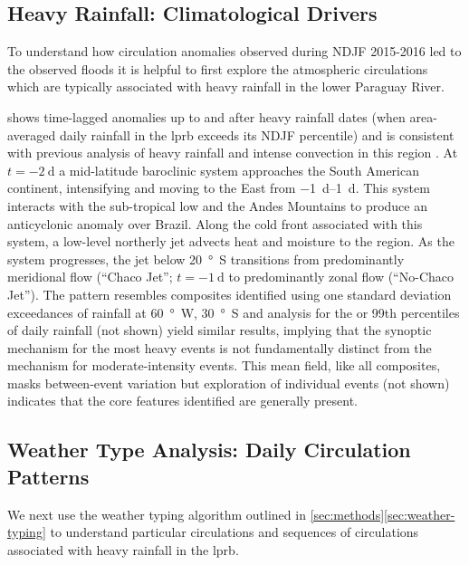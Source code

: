 \documentclass[twocol]{ametsoc}
\begin{document}
\subsection{Heavy Rainfall: Climatological Drivers} \label{sec:rainfall-circulation}

To understand how circulation anomalies observed during NDJF 2015-2016 led to the observed floods it is helpful to first explore the atmospheric circulations which are typically associated with heavy rainfall in the lower Paraguay River.

 shows time-lagged anomalies up to and after heavy rainfall dates (when area-averaged daily rainfall in the \gls{lprb} exceeds its NDJF  percentile) and is consistent with previous analysis of heavy rainfall and intense convection in this region \citep{Liebmann2004,Marengo2004,Salio2007,Marwan2015}.
At $t=\SI{-2}{\day}$ a mid-latitude baroclinic system approaches the South American continent, intensifying and moving to the East from \SIrange{-1}{1}{\day}.
This system interacts with the sub-tropical low and the Andes Mountains to produce an anticyclonic anomaly over Brazil.
Along the cold front associated with this system, a low-level northerly jet advects  heat and moisture to the region.
As the system progresses, the jet below \SI{20}{\degree S} transitions from predominantly meridional flow (``Chaco Jet''; $t=\SI{-1}{\day}$ to predominantly zonal flow (``No-Chaco Jet'').
The pattern resembles composites identified using one standard deviation exceedances of rainfall at \SI{60}{\degree W}, \SI{30}{\degree S} \citep{Liebmann2004} and analysis for the  or 99th percentiles of daily rainfall (not shown) yield similar results, implying that the synoptic mechanism for the most heavy events is not fundamentally distinct from the mechanism for moderate-intensity events.
This mean field, like all composites, masks between-event variation but exploration of individual events (not shown) indicates that the core features identified are generally present.

\subsection{Weather Type Analysis: Daily Circulation Patterns} \label{sec:weather-types}

We next use the weather typing algorithm outlined in \cref{sec:methods}\ref{sec:weather-typing} to understand particular circulations and sequences of circulations associated with heavy rainfall in the \gls{lprb}.
\end{document}
